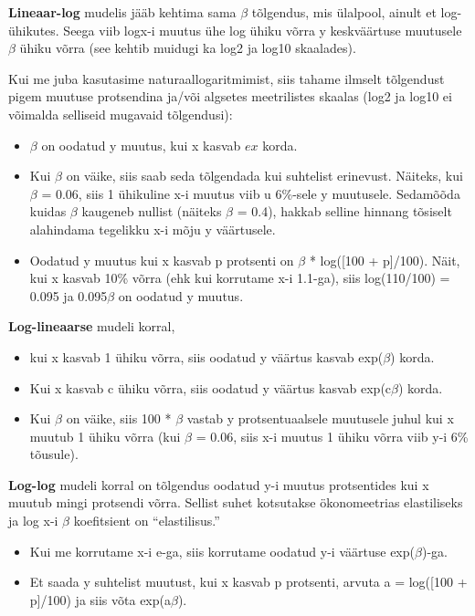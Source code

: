 \documentclass[]{book}
\begin{document}
\textbf{Lineaar-log} mudelis jääb kehtima sama \(\beta\) tõlgendus, mis
ülalpool, ainult et log-ühikutes. Seega viib logx-i muutus ühe log ühiku
võrra y keskväärtuse muutusele \(\beta\) ühiku võrra (see kehtib muidugi
ka log2 ja log10 skaalades).

Kui me juba kasutasime naturaallogaritmimist, siis tahame ilmselt
tõlgendust pigem muutuse protsendina ja/või algsetes meetrilistes
skaalas (log2 ja log10 ei võimalda selliseid mugavaid tõlgendusi):

\begin{itemize}
\item
  \(\beta\) on oodatud y muutus, kui x kasvab \(ex\) korda.
\item
  Kui \(\beta\) on väike, siis saab seda tõlgendada kui suhtelist
  erinevust. Näiteks, kui \(\beta\) = 0.06, siis 1 ühikuline x-i muutus
  viib u 6\%-sele y muutusele. Sedamõõda kuidas \(\beta\) kaugeneb
  nullist (näiteks \(\beta\) = 0.4), hakkab selline hinnang tõsiselt
  alahindama tegelikku x-i mõju y väärtusele.
\item
  Oodatud y muutus kui x kasvab p protsenti on \(\beta\) * log({[}100 +
  p{]}/100). Näit, kui x kasvab 10\% võrra (ehk kui korrutame x-i
  1.1-ga), siis log(110/100) = 0.095 ja 0.095\(\beta\) on oodatud y
  muutus.
\end{itemize}

\textbf{Log-lineaarse} mudeli korral,

\begin{itemize}
\item
  kui x kasvab 1 ühiku võrra, siis oodatud y väärtus kasvab
  exp(\(\beta\)) korda.
\item
  Kui x kasvab c ühiku võrra, siis oodatud y väärtus kasvab
  exp(c\(\beta\)) korda.
\item
  Kui \(\beta\) on väike, siis 100 * \(\beta\) vastab y protsentuaalsele
  muutusele juhul kui x muutub 1 ühiku võrra (kui \(\beta\) = 0.06, siis
  x-i muutus 1 ühiku võrra viib y-i 6\% tõusule).
\end{itemize}

\textbf{Log-log} mudeli korral on tõlgendus oodatud y-i muutus
protsentides kui x muutub mingi protsendi võrra. Sellist suhet
kotsutakse ökonomeetrias elastiliseks ja log x-i \(\beta\) koefitsient
on ``elastilisus.''

\begin{itemize}
\item
  Kui me korrutame x-i e-ga, siis korrutame oodatud y-i väärtuse
  exp(\(\beta\))-ga.
\item
  Et saada y suhtelist muutust, kui x kasvab p protsenti, arvuta a =
  log({[}100 + p{]}/100) ja siis võta exp(a\(\beta\)).
\end{itemize}
\end{document}
